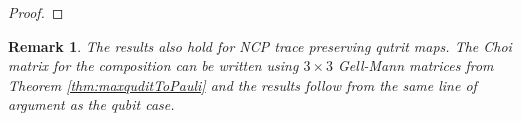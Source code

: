 \documentclass[12pt]{iopart}
\newtheorem*{remark}{Remark}
\begin{document}
\begin{proof}
\end{proof}
\begin{remark}
    The results also hold for NCP trace preserving qutrit maps. The Choi matrix for the composition can be written using $3\times 3$ Gell-Mann matrices from Theorem \ref{thm:maxquditToPauli} and the results follow from the same line of argument as the qubit case.
\end{remark}
\end{document}
